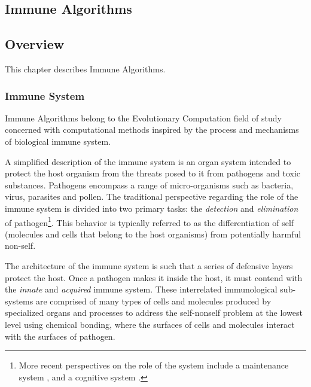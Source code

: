 

\renewcommand{\bibsection}{\subsection{\bibname}}
\begin{bibunit}

\chapter{Immune Algorithms}
\label{ch:immune}

\section{Overview}
This chapter describes Immune Algorithms.

\subsection{Immune System}
Immune Algorithms belong to the Evolutionary Computation field of study concerned with computational methods inspired by the process and mechanisms of biological immune system. 

A simplified description of the immune system is an organ system intended to protect the host organism from the threats posed to it from pathogens and toxic substances. Pathogens encompass a range of micro-organisms such as bacteria, virus, parasites and pollen. The traditional perspective regarding the role of the immune system is divided into two primary tasks: the \emph{detection} and \emph{elimination} of pathogen\footnote{More recent perspectives on the role of the system include a maintenance system \cite{Cohen2001a}, and a cognitive system \cite{Varela1994}.}. This behavior is typically referred to as the differentiation of self (molecules and cells that belong to the host organisms) from potentially harmful non-self. 

The architecture of the immune system is such that a series of defensive layers protect the host. Once a pathogen makes it inside the host, it must contend with the \emph{innate} and \emph{acquired} immune system. These interrelated immunological sub-systems are comprised of many types of cells  and molecules produced by specialized organs and processes to address the self-nonself problem at the lowest level using chemical bonding, where the surfaces of cells and molecules interact with the surfaces of pathogen.


\end{bibunit}
